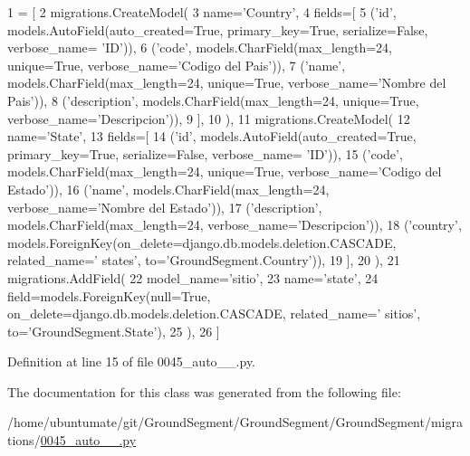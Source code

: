 \begin{DoxyCode}
1 = [
2         migrations.CreateModel(
3             name=\textcolor{stringliteral}{'Country'},
4             fields=[
5                 (\textcolor{stringliteral}{'id'}, models.AutoField(auto\_created=\textcolor{keyword}{True}, primary\_key=\textcolor{keyword}{True}, serialize=\textcolor{keyword}{False}, verbose\_name=\textcolor{stringliteral}{
      'ID'})),
6                 (\textcolor{stringliteral}{'code'}, models.CharField(max\_length=24, unique=\textcolor{keyword}{True}, verbose\_name=\textcolor{stringliteral}{'Codigo del Pais'})),
7                 (\textcolor{stringliteral}{'name'}, models.CharField(max\_length=24, unique=\textcolor{keyword}{True}, verbose\_name=\textcolor{stringliteral}{'Nombre del Pais'})),
8                 (\textcolor{stringliteral}{'description'}, models.CharField(max\_length=24, unique=\textcolor{keyword}{True}, verbose\_name=\textcolor{stringliteral}{'Descripcion'})),
9             ],
10         ),
11         migrations.CreateModel(
12             name=\textcolor{stringliteral}{'State'},
13             fields=[
14                 (\textcolor{stringliteral}{'id'}, models.AutoField(auto\_created=\textcolor{keyword}{True}, primary\_key=\textcolor{keyword}{True}, serialize=\textcolor{keyword}{False}, verbose\_name=\textcolor{stringliteral}{
      'ID'})),
15                 (\textcolor{stringliteral}{'code'}, models.CharField(max\_length=24, unique=\textcolor{keyword}{True}, verbose\_name=\textcolor{stringliteral}{'Codigo del Estado'})),
16                 (\textcolor{stringliteral}{'name'}, models.CharField(max\_length=24, verbose\_name=\textcolor{stringliteral}{'Nombre del Estado'})),
17                 (\textcolor{stringliteral}{'description'}, models.CharField(max\_length=24, verbose\_name=\textcolor{stringliteral}{'Descripcion'})),
18                 (\textcolor{stringliteral}{'country'}, models.ForeignKey(on\_delete=django.db.models.deletion.CASCADE, related\_name=\textcolor{stringliteral}{'
      states'}, to=\textcolor{stringliteral}{'GroundSegment.Country'})),
19             ],
20         ),
21         migrations.AddField(
22             model\_name=\textcolor{stringliteral}{'sitio'},
23             name=\textcolor{stringliteral}{'state'},
24             field=models.ForeignKey(null=\textcolor{keyword}{True}, on\_delete=django.db.models.deletion.CASCADE, related\_name=\textcolor{stringliteral}{'
      sitios'}, to=\textcolor{stringliteral}{'GroundSegment.State'}),
25         ),
26     ]
\end{DoxyCode}


Definition at line 15 of file 0045\+\_\+auto\+\_\+\_.\+py.



The documentation for this class was generated from the following file\+:\begin{DoxyCompactItemize}
\item 
/home/ubuntumate/git/\+Ground\+Segment/\+Ground\+Segment/\+Ground\+Segment/migrations/\hyperlink{0045__auto__20170206__1323_8py}{0045\+\_\+auto\+\_\+\_.\+py}\end{DoxyCompactItemize}
